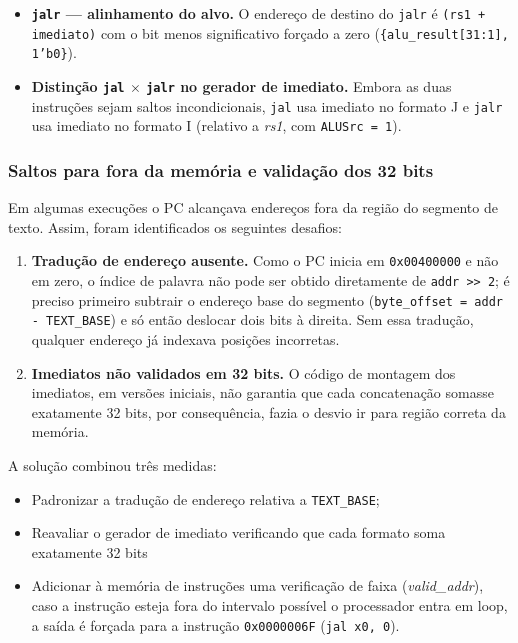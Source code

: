 \documentclass[conference]{IEEEtran}
\begin{document}
\begin{itemize}
    \item \textbf{\texttt{jalr} — alinhamento do alvo.} O endereço de destino do \texttt{jalr} é
    \texttt{(rs1 + imediato)} com o bit menos significativo forçado a zero
    (\texttt{\{alu\_result[31:1], 1'b0\}}).

    \item \textbf{Distinção \texttt{jal} $\times$ \texttt{jalr} no gerador de imediato.} Embora as duas instruções sejam
    saltos incondicionais, \texttt{jal} usa imediato no formato J e \texttt{jalr} usa
    imediato no formato I (relativo a \textit{rs1}, com \texttt{ALUSrc = 1}).
\end{itemize}

\subsubsection{Saltos para fora da memória e validação dos 32 bits}
Em algumas execuções o PC alcançava endereços fora da região do segmento de texto. Assim, foram identificados
os seguintes desafios:

\begin{enumerate}
    \item \textbf{Tradução de endereço ausente.} Como o PC inicia em \texttt{0x00400000} e não em zero, o
    índice de palavra não pode ser obtido diretamente de \texttt{addr >> 2}; é preciso primeiro subtrair o
    endereço base do segmento (\texttt{byte\_offset = addr - TEXT\_BASE}) e só então deslocar dois bits à
    direita. Sem essa tradução, qualquer endereço já indexava posições incorretas.

    \item \textbf{Imediatos não validados em 32 bits.} O código de montagem dos imediatos, em versões
    iniciais, não garantia que cada concatenação somasse exatamente 32 bits, por
    consequência, fazia o desvio ir para região correta da memória.
\end{enumerate}

A solução combinou três medidas:
\begin{itemize}
    \item Padronizar a tradução de endereço relativa a
\texttt{TEXT\_BASE};
    \item Reavaliar o gerador de imediato verificando que cada
formato soma exatamente 32 bits
    \item Adicionar à memória de instruções uma verificação de faixa
(\textit{valid\_addr}), caso a instrução esteja fora do intervalo possível o processador entra em loop, 
a saída é forçada para a instrução \texttt{0x0000006F} (\texttt{jal x0, 0}).
\end{itemize}
\end{document}
